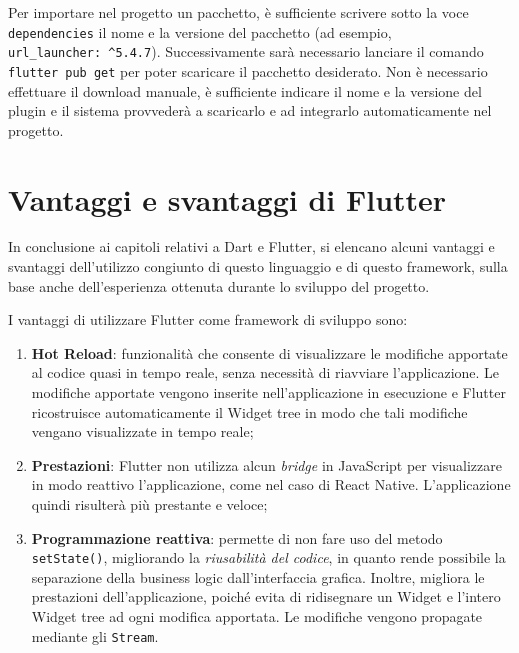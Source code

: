 Per importare nel progetto un pacchetto, è sufficiente scrivere sotto la voce \verb|dependencies| il nome e la versione del pacchetto (ad esempio, \\ \verb|url_launcher: ^5.4.7|\cite{pacchetto_url_launcher}). Successivamente sarà necessario lanciare il comando \verb|flutter pub get| per poter scaricare il pacchetto desiderato. Non è necessario effettuare il download manuale, è sufficiente indicare il nome e la versione del plugin e il sistema provvederà a scaricarlo e ad integrarlo automaticamente nel progetto.

\section{Vantaggi e svantaggi di Flutter}
In conclusione ai capitoli relativi a Dart e Flutter, si elencano alcuni vantaggi e svantaggi dell'utilizzo congiunto di questo linguaggio e di questo framework, sulla base anche dell'esperienza ottenuta durante lo sviluppo del progetto.

I vantaggi di utilizzare Flutter come framework di sviluppo sono:
\begin{enumerate}
	\item \textbf{Hot Reload}: funzionalità che consente di visualizzare le modifiche apportate al codice quasi in tempo reale, senza necessità di riavviare l'applicazione. Le modifiche apportate vengono inserite nell'applicazione in esecuzione e Flutter ricostruisce automaticamente il Widget tree in modo che tali modifiche vengano visualizzate in tempo reale;
	\item \textbf{Prestazioni}: Flutter non utilizza alcun \textit{bridge} in JavaScript per visualizzare in modo reattivo l'applicazione, come nel caso di React Native. L'applicazione quindi risulterà più prestante e veloce;
	\item \textbf{Programmazione reattiva}: permette di non fare uso del metodo \\ \verb|setState()|, migliorando la \textit{riusabilità del codice}, in quanto rende possibile la separazione della business logic dall'interfaccia grafica. Inoltre, migliora le prestazioni dell’applicazione, poiché evita di ridisegnare un Widget e l’intero Widget tree ad ogni modifica apportata. Le modifiche vengono propagate mediante gli \verb|Stream|.
\end{enumerate}

